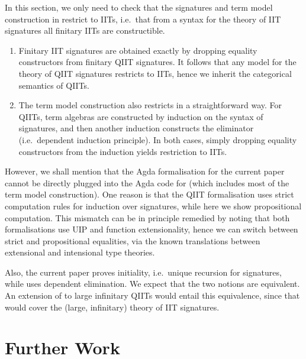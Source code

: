 \documentclass[a4paper,UKenglish,cleveref, autoref]{lipics-v2019}
\begin{document}
In this section, we only need to check that the signatures and term model
construction in \cite{Kaposi:2019:CQI:3302515.3290315} restrict to IITs,
i.e.\ that from a syntax for the theory of IIT signatures all finitary IITs are
constructible.

\begin{enumerate}
\item
  Finitary IIT signatures are obtained exactly by dropping equality constructors from
  finitary QIIT signatures. It follows that any model for the theory of QIIT signatures
  restricts to IITs, hence we inherit the categorical semantics of QIITs.
\item
  The term model construction also restricts in a straightforward way. For QIITs,
  term algebras are constructed by induction on the syntax of signatures, and
  then another induction constructs the eliminator (i.e.\ dependent induction
  principle). In both cases, simply dropping equality constructors from the
  induction yields restriction to IITs.
\end{enumerate}

However, we shall mention that the Agda formalisation for the current paper
cannot be directly plugged into the Agda code for
\cite{Kaposi:2019:CQI:3302515.3290315} (which includes most of the term model
construction). One reason is that the QIIT formalisation uses strict computation
rules for induction over signatures, while here we show propositional
computation. This mismatch can be in principle remedied by noting that both
formalisations use UIP and function extensionality, hence we can switch between
strict and propositional equalities, via the known translations between
extensional and intensional type
theories\cite{hofmann95extensional,winterhalter2019eliminating}.

Also, the current paper proves initiality, i.e.\ unique recursion for
signatures, while \cite{Kaposi:2019:CQI:3302515.3290315} uses dependent
elimination. We expect that the two notions are equivalent. An extension of
\cite{Kaposi:2019:CQI:3302515.3290315} to large infinitary QIITs would entail
this equivalence, since that would cover the (large, infinitary) theory of IIT
signatures.


\section{Further Work}
\end{document}
